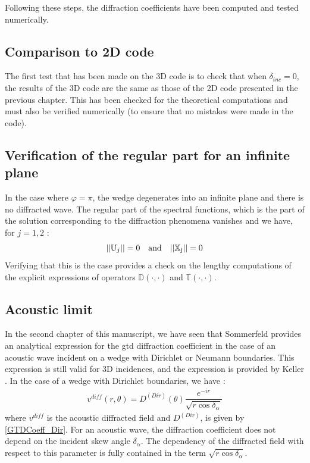 Following these steps, the diffraction coefficients have been computed and tested numerically.

\subsection{Comparison to 2D code}
The first test that has been made on the 3D code is to check that when $\delta_{inc}=0$, the results of the 3D code are the same as those of the 2D code presented in the previous chapter. This has been checked for the theoretical computations and must also be verified numerically (to ensure that no mistakes were made in the code).

\subsection{Verification of the regular part for an infinite plane}
In the case where $\varphi=\pi$, the wedge degenerates into an infinite plane and there is no diffracted wave. The regular part of the spectral functions, which is the part of the solution corresponding to the diffraction phenomena vanishes and we have, for $j=1,2$ :
\begin{equation}
||\mathbb{U}_j||=0 \hspace{1em} \rm and \hspace{1em} ||\mathbb{X}_j||=0
\end{equation}
Verifying that this is the case provides a check on the lengthy computations of the explicit expressions of operators $\mathbb{D}(\cdot,\cdot)$ and $\mathbb{T}(\cdot,\cdot)$.

\subsection{Acoustic limit}
In the second chapter of this manuscript, we have seen that Sommerfeld \cite{Sommerfeld} provides an analytical expression for the \acrshort{gtd} diffraction coefficient in the case of an acoustic wave incident on a wedge with Dirichlet or Neumann boundaries. This expression is still valid for 3D incidences, and the expression is provided by Keller \cite{GTD}. In the case of a wedge with Dirichlet boundaries, we have :
\begin{equation}
\begin{split}
v^{diff}(r,\theta)=D^{(Dir)}(\theta)\dfrac{e^{-ir}}{\sqrt{r\cos\delta_{\alpha}}}
\end{split}
\end{equation}
where $v^{diff}$ is the acoustic diffracted field and $D^{(Dir)}$, is given by \eqref{GTDCoeff_Dir}. For an acoustic wave, the diffraction coefficient does not depend on the incident skew angle $\delta_{\alpha}$. The dependency of the diffracted field with respect to this parameter is fully contained in the term $\sqrt{r\cos\delta_{\alpha}}$.

